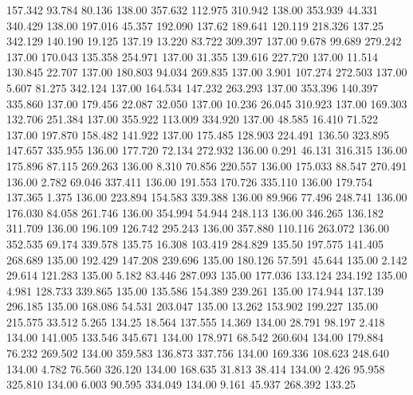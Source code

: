  157.342   93.784   80.136       138.00
 357.632  112.975  310.942       138.00
 353.939   44.331  340.429       138.00
 197.016   45.357  192.090       137.62
 189.641  120.119  218.326       137.25
 342.129  140.190   19.125       137.19
  13.220   83.722  309.397       137.00
   9.678   99.689  279.242       137.00
 170.043  135.358  254.971       137.00
  31.355  139.616  227.720       137.00
  11.514  130.845   22.707       137.00
 180.803   94.034  269.835       137.00
   3.901  107.274  272.503       137.00
   5.607   81.275  342.124       137.00
 164.534  147.232  263.293       137.00
 353.396  140.397  335.860       137.00
 179.456   22.087   32.050       137.00
  10.236   26.045  310.923       137.00
 169.303  132.706  251.384       137.00
 355.922  113.009  334.920       137.00
  48.585   16.410   71.522       137.00
 197.870  158.482  141.922       137.00
 175.485  128.903  224.491       136.50
 323.895  147.657  335.955       136.00
 177.720   72.134  272.932       136.00
   0.291   46.131  316.315       136.00
 175.896   87.115  269.263       136.00
   8.310   70.856  220.557       136.00
 175.033   88.547  270.491       136.00
   2.782   69.046  337.411       136.00
 191.553  170.726  335.110       136.00
 179.754  137.365    1.375       136.00
 223.894  154.583  339.388       136.00
  89.966   77.496  248.741       136.00
 176.030   84.058  261.746       136.00
 354.994   54.944  248.113       136.00
 346.265  136.182  311.709       136.00
 196.109  126.742  295.243       136.00
 357.880  110.116  263.072       136.00
 352.535   69.174  339.578       135.75
  16.308  103.419  284.829       135.50
 197.575  141.405  268.689       135.00
 192.429  147.208  239.696       135.00
 180.126   57.591   45.644       135.00
   2.142   29.614  121.283       135.00
   5.182   83.446  287.093       135.00
 177.036  133.124  234.192       135.00
   4.981  128.733  339.865       135.00
 135.586  154.389  239.261       135.00
 174.944  137.139  296.185       135.00
 168.086   54.531  203.047       135.00
  13.262  153.902  199.227       135.00
 215.575   33.512    5.265       134.25
  18.564  137.555   14.369       134.00
  28.791   98.197    2.418       134.00
 141.005  133.546  345.671       134.00
 178.971   68.542  260.604       134.00
 179.884   76.232  269.502       134.00
 359.583  136.873  337.756       134.00
 169.336  108.623  248.640       134.00
   4.782   76.560  326.120       134.00
 168.635   31.813   38.414       134.00
   2.426   95.958  325.810       134.00
   6.003   90.595  334.049       134.00
   9.161   45.937  268.392       133.25
